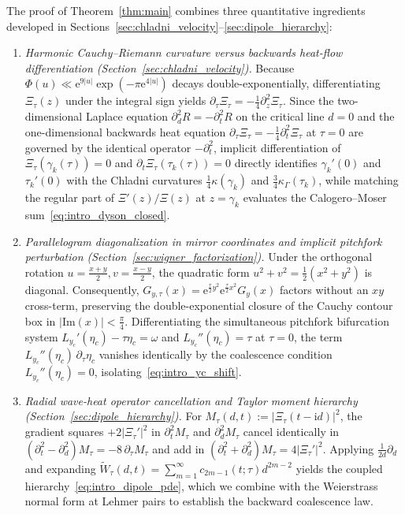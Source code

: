 \documentclass[11pt,reqno]{amsart}
\theoremstyle{definition}
\theoremstyle{remark}
\numberwithin{equation}{section}
\newcommand{\ee}{\mathrm{e}}
\newcommand{\ii}{\mathrm{i}}
\newcommand{\Ima}{\mathrm{Im}}
\begin{document}
The proof of Theorem~\ref{thm:main} combines three quantitative ingredients developed in Sections~\ref{sec:chladni_velocity}--\ref{sec:dipole_hierarchy}:
\begin{enumerate}[label=\textup{(\arabic*)},leftmargin=2.2em]
\item \textit{Harmonic Cauchy--Riemann curvature versus backwards heat-flow differentiation (Section~\ref{sec:chladni_velocity}).} Because $\Phi(u) \ll \ee^{9|u|}\exp(-\pi\ee^{4|u|})$ decays double-exponentially, differentiating $\Xi_\tau(z)$ under the integral sign yields $\partial_\tau\Xi_\tau = -\frac{1}{4}\partial_z^2\Xi_\tau$. Since the two-dimensional Laplace equation $\partial_d^2 R = -\partial_t^2 R$ on the critical line $d = 0$ and the one-dimensional backwards heat equation $\partial_\tau\Xi_\tau = -\frac{1}{4}\partial_t^2\Xi_\tau$ at $\tau = 0$ are governed by the identical operator $-\partial_t^2$, implicit differentiation of $\Xi_\tau(\gamma_k(\tau)) = 0$ and $\partial_t\Xi_\tau(\tau_k(\tau)) = 0$ directly identifies $\gamma_k'(0)$ and $\tau_k'(0)$ with the Chladni curvatures $\frac{1}{4}\kappa(\gamma_k)$ and $\frac{3}{4}\kappa_\Gamma(\tau_k)$, while matching the regular part of $\Xi'(z)/\Xi(z)$ at $z = \gamma_k$ evaluates the Calogero--Moser sum~\eqref{eq:intro_dyson_closed}.
\item \textit{Parallelogram diagonalization in mirror coordinates and implicit pitchfork perturbation (Section~\ref{sec:wigner_factorization}).} Under the orthogonal rotation $u = \frac{x+y}{2}, v = \frac{x-y}{2}$, the quadratic form $u^2 + v^2 = \frac{1}{2}(x^2 + y^2)$ is diagonal. Consequently, $G_{y,\tau}(x) = \ee^{\frac{\tau}{2}y^2}\ee^{\frac{\tau}{2}x^2}G_y(x)$ factors without an $xy$ cross-term, preserving the double-exponential closure of the Cauchy contour box in $|\Ima(x)| < \frac{\pi}{4}$. Differentiating the simultaneous pitchfork bifurcation system $L_{y_c}'(\eta_c) - \tau\eta_c = \omega$ and $L_{y_c}''(\eta_c) = \tau$ at $\tau = 0$, the term $L_{y_c}''(\eta_c)\,\partial_\tau\eta_c$ vanishes identically by the coalescence condition $L_{y_c}''(\eta_c) = 0$, isolating~\eqref{eq:intro_yc_shift}.
\item \textit{Radial wave-heat operator cancellation and Taylor moment hierarchy (Section~\ref{sec:dipole_hierarchy}).} For $M_\tau(d,t) := |\Xi_\tau(t-\ii d)|^2$, the gradient squares $+2|\Xi_\tau'|^2$ in $\partial_t^2 M_\tau$ and $\partial_d^2 M_\tau$ cancel identically in $(\partial_t^2 - \partial_d^2)M_\tau = -8\,\partial_\tau M_\tau$ and add in $(\partial_t^2 + \partial_d^2)M_\tau = 4|\Xi_\tau'|^2$. Applying $\frac{1}{2d}\partial_d$ and expanding $\widetilde{W}_\tau(d,t) = \sum_{m=1}^\infty c_{2m-1}(t;\tau)d^{2m-2}$ yields the coupled hierarchy~\eqref{eq:intro_dipole_pde}, which we combine with the Weierstrass normal form at Lehmer pairs to establish the backward coalescence law.
\end{enumerate}
\end{document}
